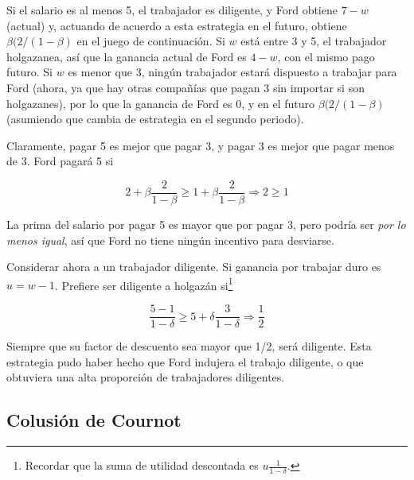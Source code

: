 \documentclass[12pt]{scrartcl}
\begin{document}
Si el salario es al menos 5, el trabajador es diligente, y Ford obtiene $7-w$ (actual) y, actuando de acuerdo a esta estrategia en el futuro, obtiene $\beta (2 / (1-\beta)$ en el juego de continuación. Si $w$ está entre 3 y 5, el trabajador holgazanea, así que la ganancia actual de Ford es $4-w$, con el mismo pago futuro. Si $w$ es menor que 3, ningún trabajador estará dispuesto a trabajar para Ford (ahora, ya que hay otras compañías que pagan 3 sin importar si son holgazanes), por lo que la ganancia de Ford es 0, y en el futuro $\beta (2 / (1-\beta)$ (asumiendo que cambia de estrategia en el segundo periodo). 

Claramente, pagar 5 es mejor que pagar 3, y pagar 3 es mejor que pagar menos de 3. Ford pagará 5 si

\[ 
    2 + \beta\frac{2}{1-\beta} \geq 1 + \beta\frac{2}{1-\beta} \Longrightarrow 2\geq 1
\]

La prima del salario por pagar 5 es mayor que por pagar 3, pero podría ser \textit{por lo menos igual}, así que Ford no tiene ningún incentivo para desviarse.

Considerar ahora a un trabajador diligente. Si ganancia por trabajar duro es $u=w - 1$. Prefiere ser diligente a holgazán si\footnote{
Recordar que la suma de utilidad descontada es $u\frac{1}{1-\delta}$.
}

\[ 
    \frac{5-1}{1-\delta} \geq 5 + \delta \frac{3}{1-\delta} \Longrightarrow \frac{1}{2}
\]

Siempre que su factor de descuento sea mayor que 1/2, será diligente. Esta estrategia pudo haber hecho que Ford indujera el trabajo diligente, o que obtuviera una alta proporción de trabajadores diligentes.

\subsection{Colusión de Cournot}

\end{document}
